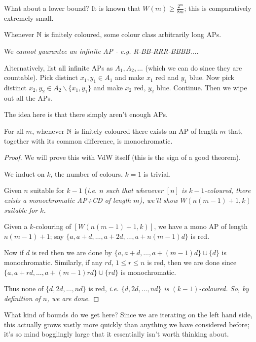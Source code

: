 \documentclass[10pt]{article}
\begin{document}
What about a lower bound? It is known that $W(m) \ge \frac{2^m}{8m}$; this is comparatively extremely small.

\begin{cor}
    Whenever $\mathbb{N}$ is finitely coloured, some colour class arbitrarily long APs. \qedsymbol
\end{cor}
\begin{remark*}
    We \it{cannot} guarantee an infinite AP - \it{e.g.} R-BB-RRR-BBBB....
    
    Alternatively, list all infinite APs as $A_1,A_2,\dots$ (which we can do since they are countable). Pick distinct $x_1,y_1\in A_1$ and make $x_1$ red and $y_1$ blue. Now pick distinct $x_2,y_2 \in A_2 \backslash \{x_1,y_1\}$ and make $x_2$ red, $y_2$ blue. Continue. Then we wipe out all the APs.

    The idea here is that there simply aren't enough APs.
\end{remark*}

\begin{theorem}
     For all $m$, whenever $\mathbb{N}$ is finitely coloured there exists an AP of length $m$ that, together with its common difference, is monochromatic.
\end{theorem}
\begin{proof}
    We will prove this with VdW itself (this is the sign of a good theorem).

    We induct on $k$, the number of colours. $k = 1$ is trivial.

    Given $n$ suitable for $k-1$ (\it{i.e.} $n$ such that whenever $[n]$ is $k-1$-coloured, there exists a monochromatic AP+CD of length $m$), we'll show $W(n(m-1)+1,k)$ suitable for $k$.

    Given a $k$-colouring of $[W(n(m-1)+1,k)]$, we have a mono AP of length $n(m-1)+1$; say $\{a,a+d,\dots,a+2d,\dots,a+n(m-1)d\}$ is red.

    Now if $d$ is red then we are done by $\{a,a+d,\dots,a+(m-1)d\}\cup\{d\}$ is monochromatic. Similarly, if any $rd$, $1\le r \le n$ is red, then we are done since $\{a,a+rd,\dots, a + (m-1)rd\}\cup\{rd\}$ is monochromatic.

    Thus none of $\{d, 2d, \dots, nd\}$ is red, \it{i.e.} $\{d,2d,\dots,nd\}$ is $(k-1)$-coloured. So, by definition of $n$, we are done.
\end{proof}

What kind of bounds do we get here? Since we are iterating on the left hand side, this actually grows vastly more quickly than anything we have considered before; it's so mind bogglingly large that it essentially isn't worth thinking about.
\end{document}

